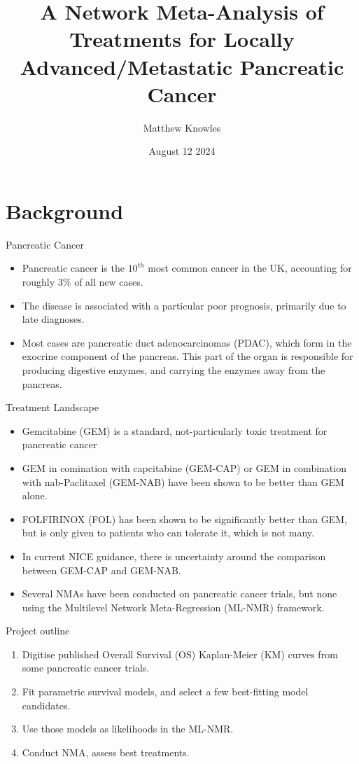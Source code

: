 \documentclass{beamer}
\title{A Network Meta-Analysis of Treatments for Locally Advanced/Metastatic Pancreatic Cancer}
\author{Matthew Knowles}
\institute{University of Sheffield}
\date{August 12 2024}
\begin{document}
\begin{frame}
    \titlepage
\end{frame} 

\section{Background}

\begin{frame}{Pancreatic Cancer}
    \begin{itemize}
        \item Pancreatic cancer is the $10^{th}$ most common cancer in the UK, accounting for roughly $3\%$ of all new cases. 
        \item The disease is associated with a particular poor prognosis, primarily due to late diagnoses.
        \item Most cases are pancreatic duct  adenocarcinomas (PDAC), which form in the exocrine component of the pancreas. This part of the organ is responsible for producing digestive enzymes, and carrying the enzymes away from the pancreas. 
    \end{itemize}
\end{frame}

\begin{frame}{Treatment Landscape}
    \begin{itemize}
        \item Gemcitabine (GEM) is a standard, not-particularly toxic treatment for pancreatic cancer
        \item GEM in comination with capcitabine (GEM-CAP) or GEM in combination with nab-Paclitaxel (GEM-NAB) have been shown to be better than GEM alone.
        \item FOLFIRINOX (FOL) has been shown to be significantly better than GEM, but is only given to patients who can tolerate it, which is not many. 
        \item In current NICE guidance, there is uncertainty around the comparison between GEM-CAP and GEM-NAB.
        \item Several NMAs have been conducted on pancreatic cancer trials, but none using the Multilevel Network Meta-Regression (ML-NMR) framework.
    \end{itemize} 
\end{frame}

\begin{frame}{Project outline}
    \begin{enumerate}
        \item Digitise published Overall Survival (OS) Kaplan-Meier (KM) curves from some pancreatic cancer trials.
        \pause
        \item Fit parametric survival models, and select a few best-fitting model candidates.
        \pause
        \item Use those models as likelihoods in the ML-NMR.
        \pause
        \item Conduct NMA, assess best treatments.
    \end{enumerate} 
\end{frame} 
\end{document}
